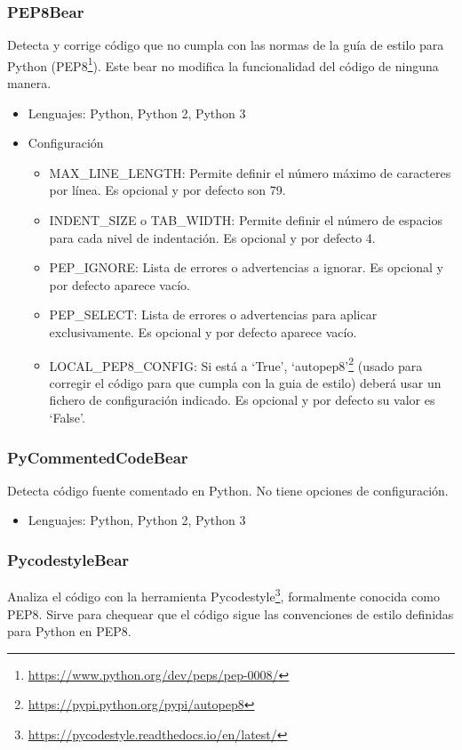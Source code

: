 \documentclass[a4paper, 12pt]{book}
\begin{document}
\subsubsection{PEP8Bear}
\label{sec:seccion1.2.5}
Detecta y corrige código que no cumpla con las normas de la guía de estilo para Python (PEP8\footnote{\url{https://www.python.org/dev/peps/pep-0008/}}). Este bear no modifica la funcionalidad del código de ninguna manera.

\begin{itemize}
  \item Lenguajes: Python, Python 2, Python 3
  \item Configuración
    \begin{itemize}
          \item MAX\_LINE\_LENGTH: Permite definir el número máximo de caracteres por línea. Es opcional y por defecto son 79.
          \item INDENT\_SIZE o TAB\_WIDTH: Permite definir el número de espacios para cada nivel de indentación. Es opcional y por defecto 4.
          \item PEP\_IGNORE: Lista de errores o advertencias a ignorar. Es opcional y por defecto aparece vacío.
          \item PEP\_SELECT: Lista de errores o advertencias para aplicar exclusivamente. Es opcional y por defecto aparece vacío.
          \item LOCAL\_PEP8\_CONFIG: Si está a `True', `autopep8'\footnote{\url{https://pypi.python.org/pypi/autopep8}} (usado para corregir el código para que cumpla con la guia de estilo) deberá usar un fichero de configuración indicado. Es opcional y por defecto su valor es `False'.
    \end{itemize}
\end{itemize}

\subsubsection{PyCommentedCodeBear}
\label{sec:seccion1.2.6}
Detecta código fuente comentado en Python. No tiene opciones de configuración.

\begin{itemize}
  \item Lenguajes: Python, Python 2, Python 3
\end{itemize}

\subsubsection{PycodestyleBear}
\label{sec:seccion1.2.7}
Analiza el código con la herramienta Pycodestyle\footnote{\url{https://pycodestyle.readthedocs.io/en/latest/}}, formalmente conocida como PEP8. Sirve para chequear que el código sigue las convenciones de estilo definidas para Python en PEP8.
\end{document}
